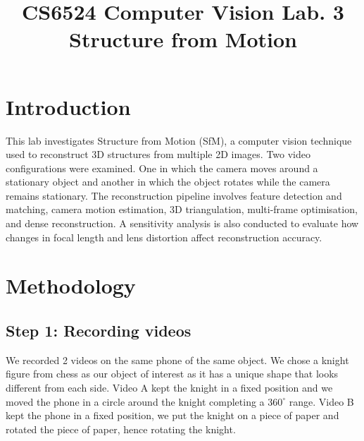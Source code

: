 \documentclass[conference]{assets/latex/IEEEtran}
\begin{document}
\title{CS6524 Computer Vision Lab. 3\\ Structure from Motion}

\author{
\and
{}
\and
{}
}

\maketitle


\section{Introduction}
This lab investigates Structure from Motion (SfM), a computer vision technique used to reconstruct 3D structures from multiple 2D images. Two video configurations were examined. One in which the camera moves around a stationary object and another in which the object rotates while the camera remains stationary. The reconstruction pipeline involves feature detection and matching, camera motion estimation, 3D triangulation, multi-frame optimisation, and dense reconstruction. A sensitivity analysis is also conducted to evaluate how changes in focal length and lens distortion affect reconstruction accuracy.

\section{Methodology}
\subsection{Step 1: Recording videos}
We recorded 2 videos on the same phone of the same object. We chose a knight figure from chess as our object of interest as it has a unique shape that looks different from each side. Video A kept the knight in a fixed position and we moved the phone in a circle around the knight completing a $360^\circ$ range. Video B kept the phone in a fixed position, we put the knight on a piece of paper and rotated the piece of paper, hence rotating the knight. 
\end{document}
